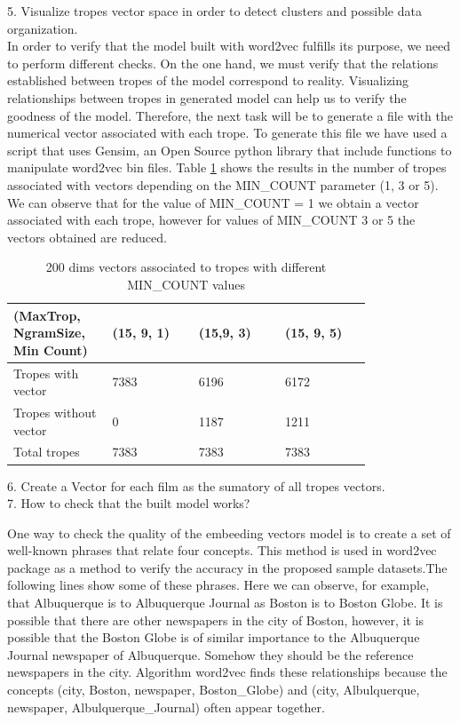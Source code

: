 \documentclass[letterpaper]{article}
\begin{document}
	
	5. Visualize tropes vector space in order to detect clusters and possible data organization. \\
	   In order to verify that the model built with word2vec fulfills its purpose, we need to perform different checks. On the one hand, 
	   we must verify that the relations established between tropes of the model correspond to reality. 
	   Visualizing relationships between tropes in generated model can help us to verify the goodness of the model.
	   Therefore, the next task will be to generate a file with the numerical vector associated with each trope. 
	   To generate this file we have used a script that uses Gensim, an Open Source python library that include functions to manipulate
	   word2vec bin files.
	   Table \ref{tab:200dims-vectors-associated-to-tropes} shows the results in the number of tropes associated with vectors depending 
	   on the MIN\_COUNT parameter (1, 3 or 5). We can observe that for the value of MIN\_COUNT = 1 we obtain a vector associated with each trope, 
	   however for values of MIN\_COUNT 3 or 5 the vectors obtained are reduced. 
	   	\begin{table}[t]
	   	\centering
	   	\begin{tabular}{|p{0.20\linewidth}|p{0.2\linewidth}|p{0.2\linewidth}|p{0.2\linewidth}|}
	   		\hline
	   		\textbf{(MaxTrop, NgramSize, Min Count)}& \textbf{(15, 9, 1)} & \textbf{(15,9, 3)} & \textbf{(15, 9, 5)}\\
	   		\hline
	   		\hline
	   		Tropes with vector&7383  & 6196 & 6172 \\
	   		\hline
	   		Tropes without vector& 0 & 1187 & 1211 \\
	   		\hline
	   		Total tropes&7383&7383&7383\\
	   		\hline
	   		
	   	\end{tabular}
	   	\caption{200 dims vectors associated to tropes with different MIN\_COUNT values}
	   	\label{tab:200dims-vectors-associated-to-tropes}
	   \end{table}	
	   
	6. Create a Vector for each film as the sumatory of all tropes vectors. \\
	
	7. How to check that the built model works?
	
	 One way to check the quality of the embeeding vectors model is to create a set of 
	 well-known phrases that relate four concepts. This method is used in word2vec package \cite{mikolov2013} as a method to verify the accuracy in 
	 the proposed sample datasets.The following lines show some of these phrases. Here we can observe, for example, that Albuquerque is to Albuquerque Journal
	  as Boston is to Boston Globe. It is possible that there are other newspapers in the city of Boston, however, it is possible that the Boston Globe is of similar importance to the Albuquerque Journal newspaper of Albuquerque. Somehow they should be the reference newspapers in the city. Algorithm word2vec finds these relationships because the concepts (city, Boston, newspaper, Boston\_Globe) and (city, Albulquerque, newspaper, Albulquerque\_Journal) often appear together.\\ 
\end{document}
